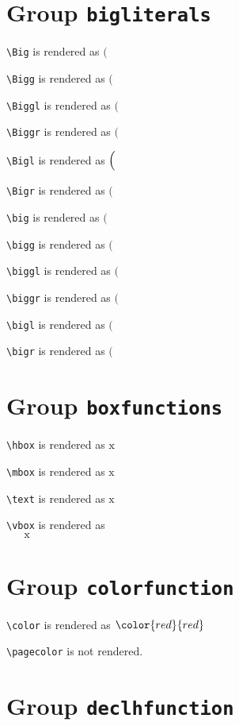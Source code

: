 \section{ Group \texttt{big\textunderscore literals}}

\texttt{\textbackslash Big} is rendered as $\Big($

\texttt{\textbackslash Bigg} is rendered as $\Bigg($

\texttt{\textbackslash Biggl} is rendered as $\Biggl($

\texttt{\textbackslash Biggr} is rendered as $\Biggr($

\texttt{\textbackslash Bigl} is rendered as $\Bigl($

\texttt{\textbackslash Bigr} is rendered as $\Bigr($

\texttt{\textbackslash big} is rendered as $\big($

\texttt{\textbackslash bigg} is rendered as $\bigg($

\texttt{\textbackslash biggl} is rendered as $\biggl($

\texttt{\textbackslash biggr} is rendered as $\biggr($

\texttt{\textbackslash bigl} is rendered as $\bigl($

\texttt{\textbackslash bigr} is rendered as $\bigr($

\section{ Group \texttt{box\textunderscore functions}}

\texttt{\textbackslash hbox} is rendered as $\hbox{x}$

\texttt{\textbackslash mbox} is rendered as $\mbox{x}$

\texttt{\textbackslash text} is rendered as $\text{x}$

\texttt{\textbackslash vbox} is rendered as $\vbox{x}$

\section{ Group \texttt{color\textunderscore function}}

\texttt{\textbackslash color} is rendered as $\color{red}{red}$

\texttt{\textbackslash pagecolor} is not rendered.

\section{ Group \texttt{declh\textunderscore function}}

